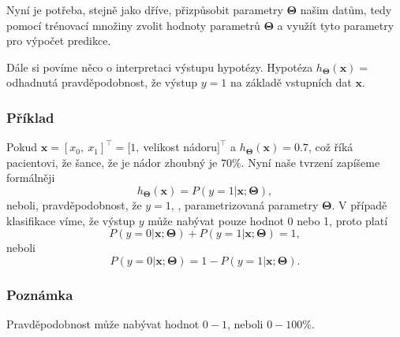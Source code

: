 \par{Nyní je potřeba, stejně jako dříve, přizpůsobit parametry $\bm{\Theta}$ našim datům, tedy pomocí trénovací množiny zvolit hodnoty parametrů $\bm{\Theta}$ a využít tyto parametry pro výpočet predikce.}

\par{Dále si povíme něco o interpretaci výstupu hypotézy. Hypotéza $h_{\bm{\Theta}} \left( \bm{x} \right) = $ odhadnutá pravděpodobnost, že výstup $y = 1$ na základě vstupních dat $\bm{x}$.}

\subsubsection*{Příklad}
\par{Pokud $\bm{x} = [ x_0,~x_1 ]^{\top} = [ 1,~$velikost nádoru$]^{\top}$ a $h_{\bm{\Theta}} \left( \bm{x} \right) = 0.7$, což říká pacientovi, že šance, že je nádor zhoubný je $70\%$. Nyní naše tvrzení zapíšeme formálněji
\begin{equation}
	h_{\bm{\Theta}} \left( \bm{x} \right) = P \left( y = 1 | \bm{x} ; \bm{\Theta} \right),
\end{equation}
neboli, pravděpodobnost, že $y = 1$, , parametrizovaná parametry $\bm{\Theta}$. V případě klasifikace víme, že výstup $y$ může nabývat pouze hodnot 0 nebo 1, proto platí
\begin{equation}
	P \left( y = 0 | \bm{x} ; \bm{\Theta} \right) + P \left( y = 1 | \bm{x} ; \bm{\Theta} \right) = 1,
\end{equation}
neboli
\begin{equation}
	P \left( y = 0 | \bm{x} ; \bm{\Theta} \right) = 1 - P \left( y = 1 | \bm{x} ; \bm{\Theta} \right).
\end{equation}}

\subsubsection*{Poznámka}
\par{Pravděpodobnost může nabývat hodnot $0-1$, neboli $0-100\%$.}





\newpage












